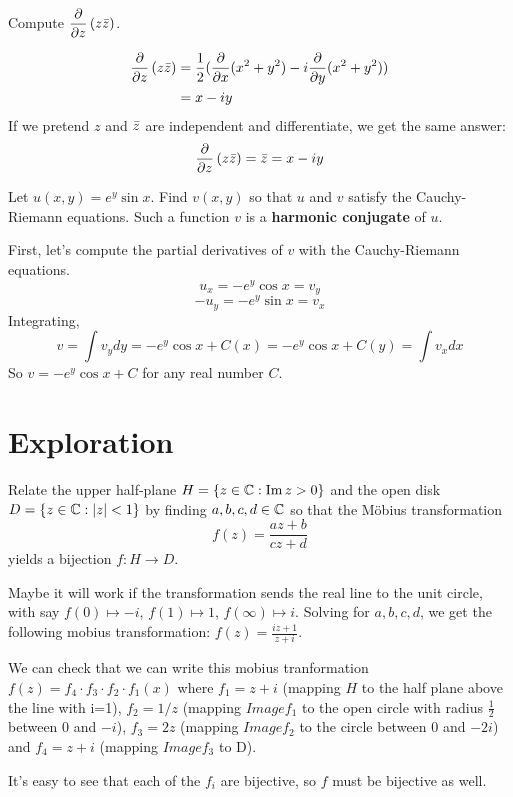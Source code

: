 \documentclass{homework}
\begin{document}
\begin{problem}
Compute $\displaystyle\frac{\partial}{\partial z} \left( z \bar{z} \right)$.
\end{problem}
\begin{solution}
\begin{align*}
\frac{\partial }{\partial z} \left( z \bar{z} \right) &= \frac{1}{2}(\frac{\partial }{\partial x}(x^2+y^2) - i\frac{\partial }{\partial y}(x^2+y^2))\\
&= x - iy\\
\end{align*}
If we pretend $z$ and $\bar{z}$ are independent and differentiate, we get the same answer:
\begin{align*}
\frac{\partial }{\partial z} \left( z \bar{z} \right) &= \bar{z} = x - iy\\
\end{align*}
\end{solution}

\begin{problem}\label{harmonic-conjugate}Let $u(x,y) = e^y \sin x$.  Find $v(x,y)$ so that $u$ and $v$ satisfy the Cauchy-Riemann equations.  Such a function $v$ is a
  \textbf{harmonic conjugate} of $u$.
\end{problem}
\begin{solution}
First, let's compute the partial derivatives of $v$ with the Cauchy-Riemann equations.
\[u_x = -e^y\cos{x} = v_y\]
\[-u_y = -e^y\sin{x} = v_x\]
Integrating, 
\[v = \int v_y dy = -e^y\cos{x} + C(x)  = -e^y\cos{x} + C(y) = \int v_x dx\]
So $v = -e^y\cos{x} + C$ for any real number $C$.
\end{solution}
\section{Exploration}

\begin{problem}\label{cayley-transform}Relate the upper half-plane
  $H = \{ z \in \mathbb{C} : \operatorname{Im} z > 0 \}$ and the open disk
  $D = \{ z \in \mathbb{C} : \left|z\right| < 1 \}$ by finding $a,b,c,d \in \mathbb{C}$ so that the M\"obius transformation
  \[f(z) = \frac{az + b}{cz + d}\] yields a bijection $f : H \to D$.
\end{problem}
\begin{solution}
Maybe it will work if the transformation sends the real line to the unit circle, with say $f(0)\mapsto -i$, $f(1)\mapsto 1$, $f(\infty)\mapsto i$. Solving for $a,b,c,d$, we get the following mobius transformation:
$f(z) = \frac{iz+1}{z + i}.$

We can check that we can write this mobius tranformation $f(z) = f_4\cdot f_3 \cdot f_2 \cdot f_1(x)$ where $f_1 = z + i$ (mapping $H$ to the half plane above the line with i=1), $f_2 = 1/z$ (mapping $Image f_1$ to the open circle with radius $\frac{1}{2}$ between 0 and $-i$), $f_3 = 2z$ (mapping $Image f_2$ to the circle between 0 and $-2i$) and $f_4 = z + i$ (mapping $Image f_3$ to D).

It's easy to see that each of the $f_i$ are bijective, so $f$ must be bijective as well.
\end{solution}
\end{document}
